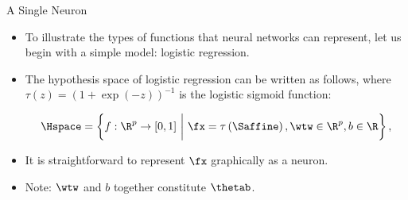 







\begin{frame} {A Single Neuron}
\begin{itemize}
\item To illustrate the types of functions that neural networks can represent, let us begin with a simple model: logistic regression.
\vspace{5mm}
\item The hypothesis space of logistic regression can be written as follows, where $\tau(z) = (1 + \exp(-z))^{-1}$ is the logistic sigmoid function:
\begin{small} 
$$\Hspace = \left\{f: \R^p \to [0, 1] ~\bigg|~ \fx = \tau\left(\Saffine\right), \wtw \in \R^p, b \in \R \right\},$$ \end{small}
\vspace{3mm}
\item It is straightforward to represent $\fx$ graphically as a neuron.
\vspace{5mm}
\item Note: $\wtw$ and $b$ together constitute $\thetab$.
\end{itemize}
\end{frame}

